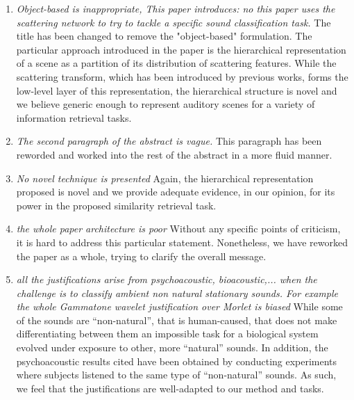 \documentclass[10pt]{article}
\begin{document}
\begin{enumerate}

\item \emph{Object-based is inappropriate, This paper introduces: no this paper uses the scattering network to try to tackle a specific sound classification task.}
The title has been changed to remove the "object-based" formulation. The particular approach introduced in the paper is the hierarchical representation of a scene as a partition of its distribution of scattering features. While the scattering transform, which has been introduced by previous works, forms the low-level layer of this representation, the hierarchical structure is novel and we believe generic enough to represent auditory scenes for a variety of information retrieval tasks.

\item \emph{The second paragraph of the abstract is vague.}
This paragraph has been reworded and worked into the rest of the abstract in a more fluid manner.

\item \emph{No novel technique is presented}
Again, the hierarchical representation proposed is novel and we provide adequate evidence, in our opinion, for its power in the proposed similarity retrieval task.

\item \emph{the whole paper architecture is poor}
Without any specific points of criticism, it is hard to address this particular statement. Nonetheless, we have reworked the paper as a whole, trying to clarify the overall message.

\item \emph{all the justifications arise from psychoacoustic, bioacoustic,... when the challenge is to classify ambient non natural stationary sounds. For example the whole Gammatone wavelet justification over Morlet is biased}
While some of the sounds are ``non-natural'', that is human-caused, that does not make differentiating between them an impossible task for a biological system evolved under exposure to other, more ``natural'' sounds. In addition, the psychoacoustic results cited have been obtained by conducting experiments where subjects listened to the same type of ``non-natural'' sounds. As such, we feel that the justifications are well-adapted to our method and tasks.


\end{enumerate}
\end{document}
